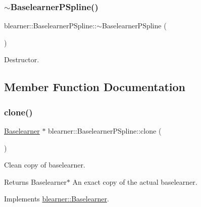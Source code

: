 \subsubsection{\texorpdfstring{$\sim$\+Baselearner\+P\+Spline()}{~BaselearnerPSpline()}}
{\footnotesize\ttfamily blearner\+::\+Baselearner\+P\+Spline\+::$\sim$\+Baselearner\+P\+Spline (\begin{DoxyParamCaption}{ }\end{DoxyParamCaption})}



Destructor. 



\subsection{Member Function Documentation}
\mbox{\label{classblearner_1_1_baselearner_p_spline_aea7d3c0ef6d77ffb8a2fb2000fae6399}} 
\subsubsection{\texorpdfstring{clone()}{clone()}}
{\footnotesize\ttfamily \hyperlink{classblearner_1_1_baselearner}{Baselearner} $\ast$ blearner\+::\+Baselearner\+P\+Spline\+::clone (\begin{DoxyParamCaption}{ }\end{DoxyParamCaption})\hspace{0.3cm}{\ttfamily [virtual]}}



Clean copy of baselearner. 

\begin{DoxyReturn}{Returns}
{\ttfamily Baselearner$\ast$} An exact copy of the actual baselearner. 
\end{DoxyReturn}


Implements \hyperlink{classblearner_1_1_baselearner_a8e12c6739f085917a7d2da6570c51a21}{blearner\+::\+Baselearner}.

